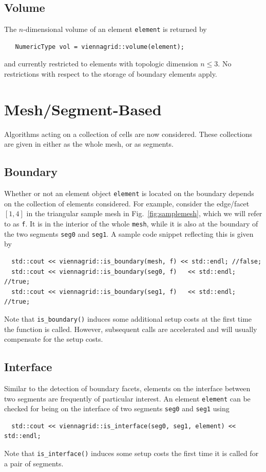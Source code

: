   \subsection{Volume}
  The $n$-dimensional volume of an element \lstinline|element| is returned by
  \begin{lstlisting}
   NumericType vol = viennagrid::volume(element);
  \end{lstlisting}
  and currently restricted to elements with topologic dimension $n \leq 3$. No restrictions with respect to the storage of boundary elements apply.


\section{Mesh/Segment-Based}
Algorithms acting on a collection of cells are now considered. These collections are given in {\ViennaGrid} either as the whole mesh, or as segments.

 \subsection{Boundary}
 Whether or not an element object \lstinline|element| is located on the boundary depends on the collection of elements considered.
 For example, consider the edge/facet $[1,4]$ in the triangular sample mesh in Fig.~\ref{fig:samplemesh}, which we will refer to as \lstinline|f|.
 It is in the interior of the whole \lstinline|mesh|, while it is also at the boundary of the two segments \lstinline|seg0| and \lstinline|seg1|.
 A sample code snippet reflecting this is given by
 \begin{lstlisting}
  std::cout << viennagrid::is_boundary(mesh, f) << std::endl; //false;
  std::cout << viennagrid::is_boundary(seg0, f)   << std::endl; //true;
  std::cout << viennagrid::is_boundary(seg1, f)   << std::endl; //true;
 \end{lstlisting}
 Note that \lstinline|is_boundary()| induces some additional setup costs at the first time the function is called. However, subsequent calls are accelerated and will usually compensate for the setup costs.



 \subsection{Interface}
  Similar to the detection of boundary facets, elements on the interface between two segments are frequently of particular interest.
  An element \lstinline|element| can be checked for being on the interface of two segments \lstinline|seg0| and \lstinline|seg1| using
 \begin{lstlisting}
  std::cout << viennagrid::is_interface(seg0, seg1, element) << std::endl;
 \end{lstlisting}
 Note that \lstinline|is_interface()| induces some setup costs the first time it is called for a pair of segments.

